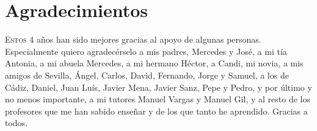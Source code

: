 \chapter*{Agradecimientos}
\pagestyle{empty}

\lettrine[lraise=-0.1, lines=2, loversize=0.25]{E}{stos} 4 años han sido mejores gracias al apoyo de algunas personas. Especialmente quiero agradecérselo a mis padres, Mercedes y José, a mi tía Antonia, a mi abuela Mercedes, a mi hermano Héctor, a Candi, mi novia, a mis amigos de Sevilla, Ángel, Carlos, David, Fernando, Jorge y Samuel, a los de Cádiz, Daniel, Juan Luís, Javier Mena, Javier Sanz, Pepe y Pedro, y por último y no menos importante, a mi tutores Manuel Vargas y Manuel Gil, y al resto de los profesores que me han sabido enseñar y de los que tanto he aprendido. Gracias a todos. 

{}%
\vspace{-.3cm}
{}%
